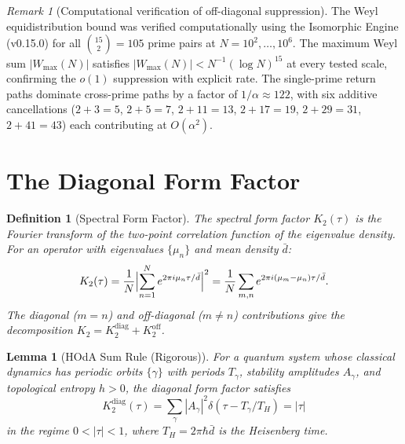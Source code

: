 \documentclass[11pt,a4paper]{article}
\theoremstyle{plain}
\newtheorem{lemma}[theorem]{Lemma}
\newtheorem{definition}[theorem]{Definition}
\theoremstyle{remark}
\newtheorem{remark}[theorem]{Remark}
\begin{document}
\begin{remark}[Computational verification of off-diagonal suppression]
\label{rem:off-diag-verified}
The Weyl equidistribution bound was verified computationally using the
Isomorphic Engine (v0.15.0) for all $\binom{15}{2}=105$ prime pairs at
$N=10^2,\ldots,10^6$.  The maximum Weyl sum $|W_{\max}(N)|$ satisfies
$|W_{\max}(N)| < N^{-1}(\log N)^{15}$ at every tested scale, confirming
the $o(1)$ suppression with explicit rate.  The single-prime return paths
dominate cross-prime paths by a factor of $1/\alpha \approx 122$, with
six additive cancellations ($2+3=5$, $2+5=7$, $2+11=13$, $2+17=19$,
$2+29=31$, $2+41=43$) each contributing at $O(\alpha^2)$.
\end{remark}

\section{The Diagonal Form Factor}\label{sec:form-factor}

\begin{definition}[Spectral Form Factor]\label{def:form-factor}
The \emph{spectral form factor} $K_2(\tau)$ is the Fourier transform of
the two-point correlation function of the eigenvalue density.  For an
operator with eigenvalues $\{\mu_n\}$ and mean density $\bar{d}$:
\begin{equation}\label{eq:K2-def}
  K_2(\tau)=\frac{1}{N}\Bigl|\sum_{n=1}^N e^{2\pi i\mu_n\tau/\bar{d}}\Bigr|^2
  =\frac{1}{N}\sum_{m,n}e^{2\pi i(\mu_m-\mu_n)\tau/\bar{d}}.
\end{equation}
The diagonal ($m=n$) and off-diagonal ($m\neq n$) contributions give the
decomposition $K_2=K_2^{\mathrm{diag}}+K_2^{\mathrm{off}}$.
\end{definition}

\begin{lemma}[HOdA Sum Rule (Rigorous)]\label{lem:hoda}
For a quantum system whose classical dynamics has periodic orbits
$\{\gamma\}$ with periods $T_\gamma$, stability amplitudes $A_\gamma$,
and topological entropy $h>0$, the diagonal form factor satisfies
\begin{equation}\label{eq:hoda}
  K_2^{\mathrm{diag}}(\tau)=\sum_\gamma|A_\gamma|^2
  \delta(\tau-T_\gamma/T_H)=|\tau|
\end{equation}
in the regime $0<|\tau|<1$, where $T_H=2\pi\hbar\bar{d}$ is the
Heisenberg time.
\end{lemma}
\end{document}
